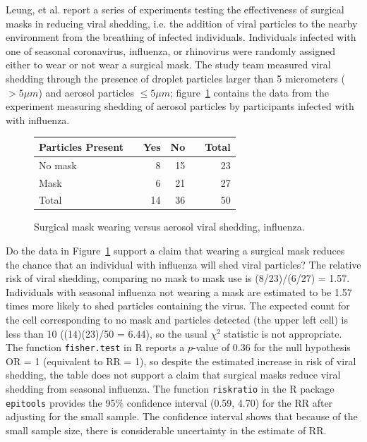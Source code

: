 Leung, et al. report a series of experiments testing the effectiveness of surgical masks in reducing viral shedding, i.e. the addition of viral particles to the nearby environment from the breathing of infected individuals.  Individuals infected with one of seasonal coronavirus, influenza, or rhinovirus were randomly assigned either to wear or not wear a surgical mask.  The study team measured viral shedding through the presence of droplet particles larger than 5 micrometers ($> 5\mu m$) and aerosol particles $\leq 5\mu m$; figure~\ref{figure:influenzaAerosolViralShedding} contains the data from the experiment measuring shedding of aerosol particles by participants infected with with influenza.
\begin{figure}[h]
	\centering
	\begin{tabular}{ll rrr |r}
		\hline
		Particles Present	& \hspace{2mm} & Yes & No & \hspace{2mm} & Total \\
		\hline
        No mask & & 8 & 15 & & 23    \\
        Mask &	& 6 & 21 & & 27    \\
        \hline
        Total & & 14 & 36 & & 50 \\
		\hline
	\end{tabular}
	\caption{Surgical mask wearing versus aerosol viral shedding, influenza.}
    \label{figure:influenzaAerosolViralShedding}
\end{figure}

\begin{examplewrap}
  \begin{nexample}{Do the data in Figure~\ref{figure:influenzaAerosolViralShedding} support a claim that wearing a surgical mask reduces the chance that an individual with influenza will shed viral particles?}
    The relative risk of viral shedding, comparing no mask to mask use is (8/23)/(6/27) = 1.57.  Individuals with seasonal influenza not wearing a mask are estimated to be 1.57 times more likely to shed particles containing the virus. The expected count for the cell corresponding to no mask and particles detected (the upper left cell) is less than 10 ((14)(23)/50 = 6.44), so the usual $\chi^2$ statistic is not appropriate.  The function \texttt{fisher.test} in \textsf{R} reports a $p$-value of 0.36 for the null hypothesis OR = 1 (equivalent to RR = 1), so despite the estimated increase in risk of viral shedding, the table does not support a claim that surgical masks reduce viral shedding from seasonal influenza.  The function \texttt{riskratio} in the \textsf{R} package \texttt{epitools} provides the 95\% confidence interval (0.59, 4.70) for the RR after adjusting for the small sample.  The confidence interval shows that because of the small sample size, there is considerable uncertainty in the estimate of RR.

  \end{nexample}
\end{examplewrap}

